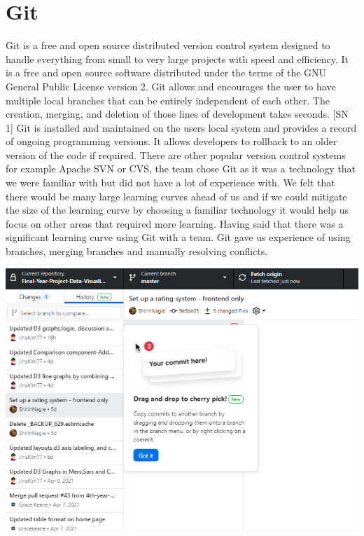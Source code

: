 \section{Git}
Git is a free and open source distributed version control system designed to handle everything from small to very large projects with speed and efficiency. It is a free and open source software distributed under the terms of the GNU General Public License version 2.
Git allows and encourages the user to have multiple local branches that can be entirely independent of each other. The creation, merging, and deletion of those lines of development takes seconds. [SN 1] 
Git is installed and maintained on the users local system and provides a record of ongoing programming versions. It allows developers to rollback to an older version of the code if required.
There are other popular version control systems for example Apache SVN or CVS, the team chose Git as it was a technology that we were familiar with but did not have a lot of experience with. We felt that there would be many large learning curves ahead of us and if we could mitigate the size of the learning curve by choosing a familiar technology it would help us focus on other areas that required more learning. Having said that there was a significant learning curve using Git with a team. Git gave us experience of using branches, merging branches and manually resolving conflicts.
\begin{center}    
      \includegraphics[scale=0.7]{img/git.PNG}
\end{center}

